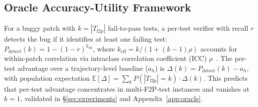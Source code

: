 \subsection{Oracle Accuracy-Utility Framework}
\label{sec:oracle}

For a buggy patch with $k = |T_{\text{f2p}}|$ fail-to-pass tests, a per-test verifier with recall $r$ detects the bug if it identifies at least one failing test: $P_{\text{detect}}(k) = 1 - (1 - r)^{k_{\text{eff}}}$, where $k_{\text{eff}} = k / (1 + (k-1)\rho)$ accounts for within-patch correlation via intraclass correlation coefficient (ICC) $\rho$~\citep{shrout1979icc}. The per-test advantage over a trajectory-level baseline ($a_h$) is $\Delta(k) = P_{\text{detect}}(k) - a_h$, with population expectation $\mathbb{E}[\Delta] = \sum_{k} P(|T_{\text{f2p}}| = k) \cdot \Delta(k)$. This predicts that per-test advantage concentrates in multi-F2P-test instances and vanishes at $k{=}1$, validated in \S\ref{sec:experiments} and Appendix~\ref{app:oracle}.
